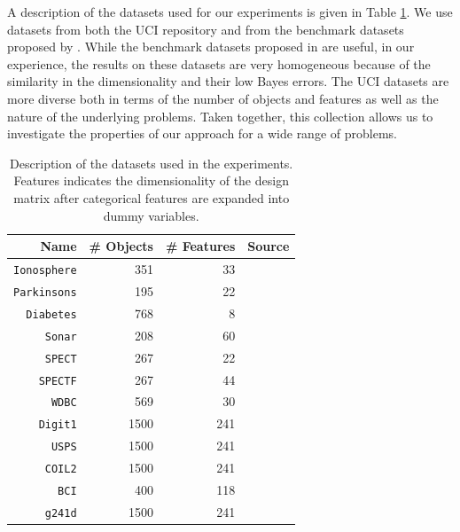 \documentclass{llncs}
\begin{document}
A description of the datasets used for our experiments is given in Table \ref{table:datasets}. We use datasets from both the UCI repository \cite{Bache2013} and from the benchmark datasets proposed by \cite{Chapelle2006}. While the benchmark datasets proposed in \cite{Chapelle2006} are useful, in our experience, the results on these datasets are very homogeneous because of the similarity in the dimensionality and their low Bayes errors. The UCI datasets are more diverse both in terms of the number of objects and features as well as the nature of the underlying problems. Taken together, this collection allows us to investigate the properties of our approach for a wide range of problems.

\begin{table}[t] 
\caption{Description of the datasets used in the experiments. Features indicates the dimensionality of the design matrix after categorical features are expanded into dummy variables.}
\begin{center}
\begin{tabular}{rrrr}
  \hline
 Name & \hspace{5 mm} \# Objects & \hspace{5 mm} \# Features  & \hspace{5 mm} Source \\ 
  \hline
  \texttt{Ionosphere} & 351 &  33 & \cite{Bache2013} \\ 
  \texttt{Parkinsons} & 195 &  22 & \cite{Bache2013} \\ 
  \texttt{Diabetes} & 768 &   8 & \cite{Bache2013} \\ 
  \texttt{Sonar} & 208 &  60 & \cite{Bache2013} \\ 
  \texttt{SPECT} & 267 &  22 & \cite{Bache2013} \\ 
  \texttt{SPECTF} & 267 &  44 & \cite{Bache2013} \\ 
  \texttt{WDBC} & 569 &  30 & \cite{Bache2013} \\
  \texttt{Digit1} & 1500 & 241 & \cite{Chapelle2006} \\ 
  \texttt{USPS} & 1500 & 241 & \cite{Chapelle2006}  \\ 
  \texttt{COIL2} & 1500 & 241 & \cite{Chapelle2006} \\ 
  \texttt{BCI} & 400 & 118 & \cite{Chapelle2006} \\ 
  \texttt{g241d} & 1500 & 241 & \cite{Chapelle2006} \\ 
   \hline
\end{tabular}
\end{center}

\label{table:datasets}
\end{table}
\end{document}

